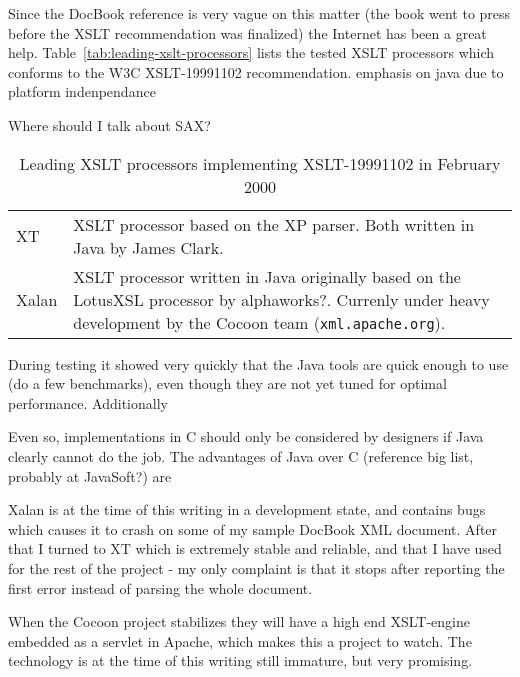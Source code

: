 Since the DocBook reference is very vague on this matter (the book
went to press before the XSLT recommendation was finalized) the
Internet has been a great help.
Table~\vref{tab:leading-xslt-processors} lists the \textsf{tested XSLT
  processors} which conforms to the W3C \textsf{XSLT-19991102}
recommendation.  \textsf{emphasis on java due to platform indenpendance}

\textsf{Where should I talk about SAX?}

\begin{table}[htbp]
  \begin{center}
    \begin{tabular}{|l|p{10cm}|}

      \hline\hline
      
      XT &  XSLT processor based on the XP parser.  Both
      written in Java\textsf{ by James Clark}. \\

      Xalan & XSLT processor written in Java originally based on the
      LotusXSL processor by \textsf{alphaworks?}.   Currenly under
      heavy development by the Cocoon team 
      (\texttt{xml.apache.org}). \\
      
      \hline
    \end{tabular}
    \caption{Leading XSLT processors implementing
      \textsf{XSLT-19991102} in February 2000} 
    \label{tab:leading-xslt-processors}
  \end{center}
\end{table}

During testing it showed very quickly that the Java tools are quick
enough to use (\textsf{do a few benchmarks}), even though they are not
yet tuned for optimal performance.  Additionally 


Even so, implementations in C
should only be considered by designers if Java clearly cannot do the
job.  The advantages of Java over C (\textsf{reference big list,
  probably at JavaSoft?}) are 

Xalan is at the time of this writing in a development state, and
contains bugs which causes it to crash on some of my sample DocBook
XML document.  After that I turned to XT which is extremely stable and
reliable, and that I have used for the rest of the project - my only
complaint is that it stops after reporting the first error instead of
parsing the whole document.


When the Cocoon project stabilizes they will have a
high end XSLT-engine embedded as a servlet in Apache, which makes this
a project to watch.  The technology is at the time of this writing
still immature, but very promising.

